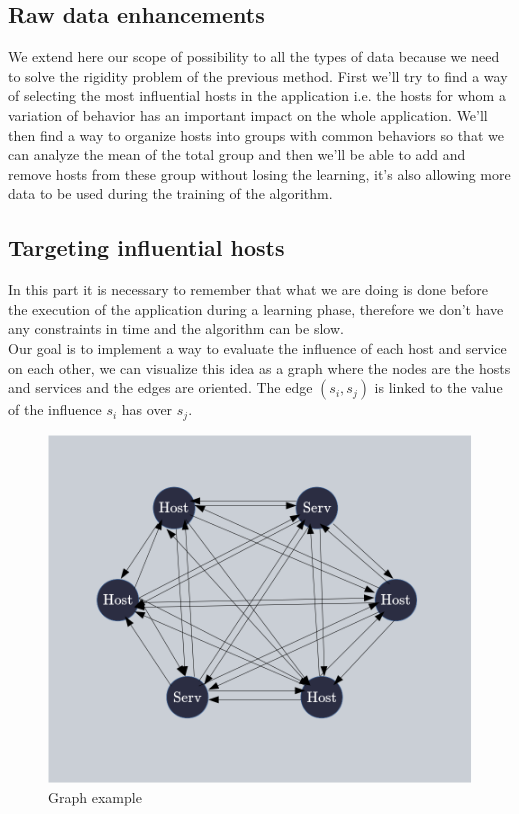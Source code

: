 \documentclass[10pt,a4paper,oneside]{article}
\begin{document}
\begin{multicols}{2}
\section{Raw data enhancements}
We extend here our scope of possibility to all the types of data because we need to solve the rigidity problem of the previous method. First we'll try to find a way of selecting the most influential hosts in the application i.e. the hosts for whom a variation of behavior has an important impact on the whole application. We'll then find a way to organize hosts into groups with common behaviors so that we can analyze the mean of the total group and then we'll be able to add and remove hosts from these group without losing the learning, it's also allowing more data to be used during the training of the algorithm.

\subsection{Targeting influential hosts}
In this part it is necessary to remember that what we are doing is done before the execution of the application during a learning phase, therefore we don't have any constraints in time and the algorithm can be slow.
\\
Our goal is to implement a way to evaluate the influence of each host and service on each other, we can visualize this idea as a graph where the nodes are the hosts and services and the edges are oriented. The edge $(s_i,s_j)$ is linked to the value of the influence $s_i$ has over $s_j$.

\end{multicols}

\vspace{0.8cm}

\begin{figure}[!h]
\centering
\includegraphics[scale=0.45]{./images/graphe.png}
\caption{Graph example}
\label{graph}
\end{figure}
\end{document}

